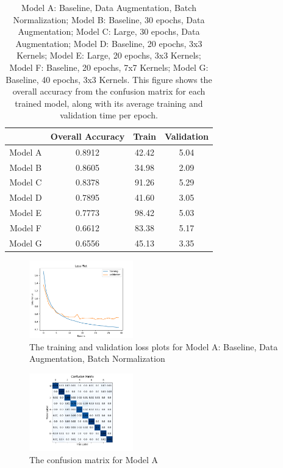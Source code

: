 \documentclass[11pt,a4paper]{article}
\begin{document}
 \begin{table}
    \centering
    \begin{tabular}{ |c|c|c|c| } 
     \hline
      & Overall Accuracy & Train & Validation \\
     \hline
     Model A & 0.8912 & 42.42 & 5.04 \\ 
     \hline
     Model B & 0.8605 & 34.98 & 2.09 \\ 
     \hline
     Model C & 0.8378 & 91.26 & 5.29 \\ 
     \hline
     Model D & 0.7895 & 41.60 & 3.05 \\ 
     \hline
     Model E & 0.7773 & 98.42 & 5.03 \\ 
     \hline
     Model F & 0.6612 & 83.38 & 5.17 \\ 
     \hline
     Model G & 0.6556 & 45.13 & 3.35 \\ 
     \hline
    
    \end{tabular}
    \caption{Model A: Baseline, Data Augmentation, Batch Normalization; Model B: Baseline, 30 epochs, Data Augmentation; Model C: Large, 30 epochs, Data Augmentation;
    Model D: Baseline, 20 epochs, 3x3 Kernels; Model E: Large, 20 epochs, 3x3 Kernels; Model F: Baseline, 20 epochs, 7x7 Kernels;
    Model G: Baseline, 40 epochs, 3x3 Kernels. This figure shows the overall accuracy from the confusion matrix 
    for each trained model, along with its average training and validation time per epoch.}
    \label{tab:table1}
\end{table}

\begin{figure}
  \centering
  \includegraphics[width=0.40\textwidth]{figures/plots.png}
  \caption{The training and validation loss plots for Model A: Baseline, Data Augmentation, Batch Normalization}
  \label{fig:plots}
\end{figure}

\begin{figure}
  \centering
  \includegraphics[width=0.40\textwidth]{figures/confusion.png}
  \caption{The confusion matrix for Model A}
  \label{fig:confusion}
\end{figure}
\end{document}
